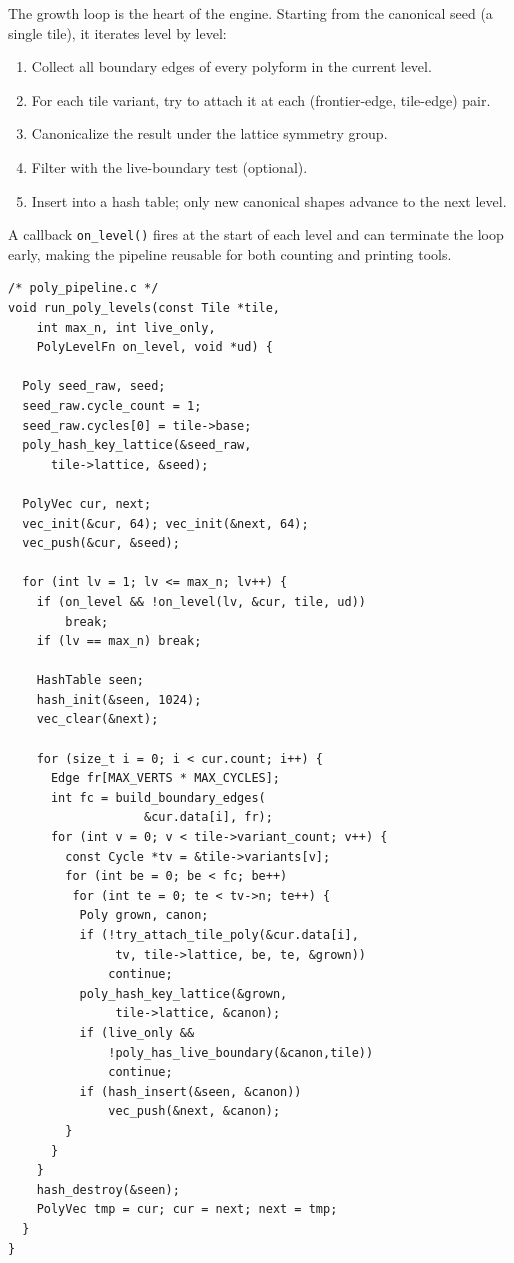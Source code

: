 \documentclass[10pt,a4paper]{article}
\newcommand{\code}[1]{\texttt{\small #1}}
\newcommand{\file}[1]{\texttt{\footnotesize #1}}
\begin{document}
\begin{tcolorbox}[dualbox, title=Core Growth Loop — \file{src/throughput/poly\_pipeline.c}]
  The growth loop is the heart of the engine.  Starting from the
  canonical seed (a single tile), it iterates level by level:

  \begin{enumerate}
    \item Collect all boundary edges of every polyform in the current
      level.
    \item For each tile variant, try to attach it at each
      (frontier-edge, tile-edge) pair.
    \item Canonicalize the result under the lattice symmetry group.
    \item Filter with the live-boundary test (optional).
    \item Insert into a hash table; only new canonical shapes advance
      to the next level.
  \end{enumerate}

  A callback \code{on\_level()} fires at the start of each level and
  can terminate the loop early, making the pipeline reusable for both
  counting and printing tools.
\tcblower
\begin{verbatim}
/* poly_pipeline.c */
void run_poly_levels(const Tile *tile,
    int max_n, int live_only,
    PolyLevelFn on_level, void *ud) {

  Poly seed_raw, seed;
  seed_raw.cycle_count = 1;
  seed_raw.cycles[0] = tile->base;
  poly_hash_key_lattice(&seed_raw,
      tile->lattice, &seed);

  PolyVec cur, next;
  vec_init(&cur, 64); vec_init(&next, 64);
  vec_push(&cur, &seed);

  for (int lv = 1; lv <= max_n; lv++) {
    if (on_level && !on_level(lv, &cur, tile, ud))
        break;
    if (lv == max_n) break;

    HashTable seen;
    hash_init(&seen, 1024);
    vec_clear(&next);

    for (size_t i = 0; i < cur.count; i++) {
      Edge fr[MAX_VERTS * MAX_CYCLES];
      int fc = build_boundary_edges(
                   &cur.data[i], fr);
      for (int v = 0; v < tile->variant_count; v++) {
        const Cycle *tv = &tile->variants[v];
        for (int be = 0; be < fc; be++)
         for (int te = 0; te < tv->n; te++) {
          Poly grown, canon;
          if (!try_attach_tile_poly(&cur.data[i],
               tv, tile->lattice, be, te, &grown))
              continue;
          poly_hash_key_lattice(&grown,
               tile->lattice, &canon);
          if (live_only &&
              !poly_has_live_boundary(&canon,tile))
              continue;
          if (hash_insert(&seen, &canon))
              vec_push(&next, &canon);
        }
      }
    }
    hash_destroy(&seen);
    PolyVec tmp = cur; cur = next; next = tmp;
  }
}
\end{verbatim}
\end{tcolorbox}
\end{document}
